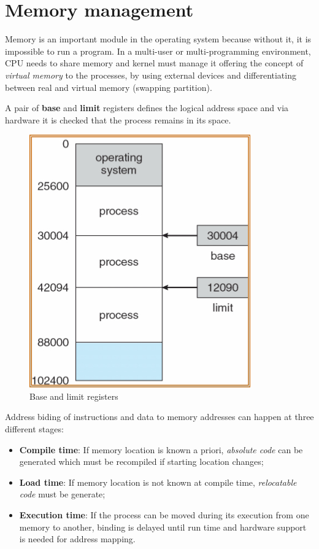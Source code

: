\chapter{Memory management}
Memory is an important module in the operating system because without it, it is impossible to run a program. In a multi-user or multi-programming environment, CPU needs to share memory and kernel must manage it offering the concept of \emph{virtual memory} to the processes, by using external devices and differentiating between real and virtual memory (swapping partition).

A pair of \textbf{base} and \textbf{limit} registers defines the logical address space and via hardware it is checked that the process remains in its space.

\begin{figure}[hbtp]
\centering
\includegraphics[scale=0.4]{images/memory_management/base_limit_regs.jpg}
\caption{Base and limit registers}
\end{figure}

Address biding of instructions and data to memory addresses can happen at three different stages:

\begin{itemize}
\item \textbf{Compile time}: If memory location is known a priori, \emph{absolute code} can be generated which must be recompiled if starting location changes;
\item \textbf{Load time}: If memory location is not known at compile time, \emph{relocatable code} must be generate;
\item \textbf{Execution time}: If the process can be moved during its execution from one memory to another, binding is delayed until run time and hardware support is needed for address mapping.
\end{itemize}

